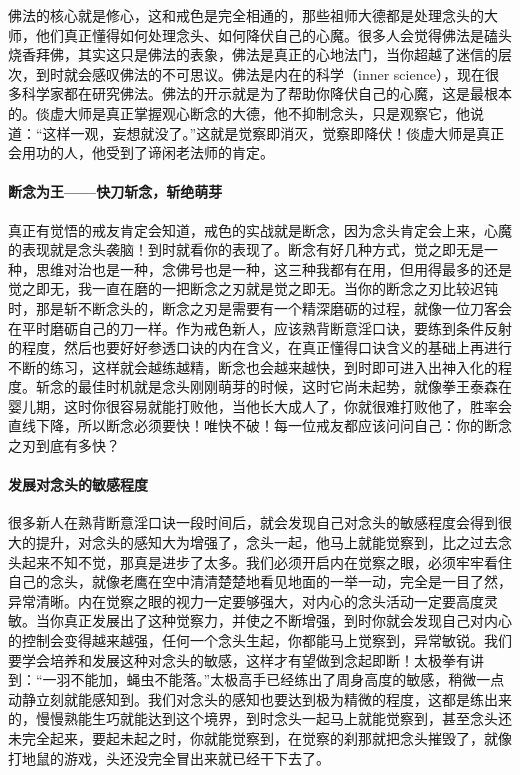 佛法的核心就是修心，这和戒色是完全相通的，那些祖师大德都是处理念头的大师，他们真正懂得如何处理念头、如何降伏自己的心魔。很多人会觉得佛法是磕头烧香拜佛，其实这只是佛法的表象，佛法是真正的心地法门，当你超越了迷信的层次，到时就会感叹佛法的不可思议。佛法是内在的科学（inner science），现在很多科学家都在研究佛法。佛法的开示就是为了帮助你降伏自己的心魔，这是最根本的。倓虚大师是真正掌握观心断念的大德，他不抑制念头，只是观察它，他说道：“这样一观，妄想就没了。”这就是觉察即消灭，觉察即降伏！倓虚大师是真正会用功的人，他受到了谛闲老法师的肯定。

\paragraph{断念为王——快刀斩念，斩绝萌芽}

真正有觉悟的戒友肯定会知道，戒色的实战就是断念，因为念头肯定会上来，心魔的表现就是念头袭脑！到时就看你的表现了。断念有好几种方式，觉之即无是一种，思维对治也是一种，念佛号也是一种，这三种我都有在用，但用得最多的还是觉之即无，我一直在磨的一把断念之刃就是觉之即无。当你的断念之刃比较迟钝时，那是斩不断念头的，断念之刃是需要有一个精深磨砺的过程，就像一位刀客会在平时磨砺自己的刀一样。作为戒色新人，应该熟背断意淫口诀，要练到条件反射的程度，然后也要好好参透口诀的内在含义，在真正懂得口诀含义的基础上再进行不断的练习，这样就会越练越精，断念也会越来越快，到时即可进入出神入化的程度。斩念的最佳时机就是念头刚刚萌芽的时候，这时它尚未起势，就像拳王泰森在婴儿期，这时你很容易就能打败他，当他长大成人了，你就很难打败他了，胜率会直线下降，所以断念必须要快！唯快不破！每一位戒友都应该问问自己：你的断念之刃到底有多快？

\paragraph{发展对念头的敏感程度}

很多新人在熟背断意淫口诀一段时间后，就会发现自己对念头的敏感程度会得到很大的提升，对念头的感知大为增强了，念头一起，他马上就能觉察到，比之过去念头起来不知不觉，那真是进步了太多。我们必须开启内在觉察之眼，必须牢牢看住自己的念头，就像老鹰在空中清清楚楚地看见地面的一举一动，完全是一目了然，异常清晰。内在觉察之眼的视力一定要够强大，对内心的念头活动一定要高度灵敏。当你真正发展出了这种觉察力，并使之不断增强，到时你就会发现自己对内心的控制会变得越来越强，任何一个念头生起，你都能马上觉察到，异常敏锐。我们要学会培养和发展这种对念头的敏感，这样才有望做到念起即断！太极拳有讲到：“一羽不能加，蝇虫不能落。”太极高手已经练出了周身高度的敏感，稍微一点动静立刻就能感知到。我们对念头的感知也要达到极为精微的程度，这都是练出来的，慢慢熟能生巧就能达到这个境界，到时念头一起马上就能觉察到，甚至念头还未完全起来，要起未起之时，你就能觉察到，在觉察的刹那就把念头摧毁了，就像打地鼠的游戏，头还没完全冒出来就已经干下去了。

